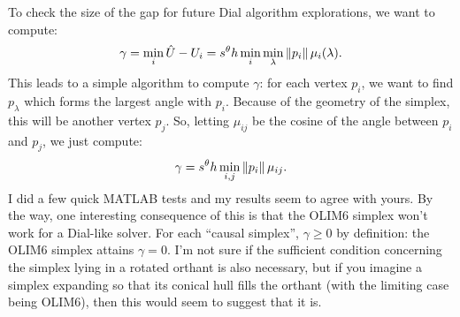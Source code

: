 \documentclass[eikonal.tex]{subfiles}
\begin{document}
To check the size of the gap for future Dial algorithm explorations,
we want to compute:
\begin{equation}
  \gamma = \min_i \hat{U} - U_i = s^\theta h \min_i \min_\lambda \left\|p_i\right\| \mu_i(\lambda).
\end{equation}
This leads to a simple algorithm to compute $\gamma$: for each vertex
$p_i$, we want to find $p_\lambda$ which forms the largest angle with
$p_i$. Because of the geometry of the simplex, this will be another
vertex $p_j$. So, letting $\mu_{ij}$ be the cosine of the angle
between $p_i$ and $p_j$, we just compute:
\begin{equation}
  \gamma = s^\theta h \min_{i,j} \left\|p_i\right\| \mu_{ij}.
\end{equation}
I did a few quick MATLAB tests and my results seem to agree with
yours.  By the way, one interesting consequence of this is that the
OLIM6 simplex won't work for a Dial-like solver. For each ``causal
simplex'', $\gamma \geq 0$ by definition: the OLIM6 simplex attains
$\gamma = 0$. I'm not sure if the sufficient condition concerning the
simplex lying in a rotated orthant is also necessary, but if you
imagine a simplex expanding so that its conical hull fills the orthant
(with the limiting case being OLIM6), then this would seem to suggest
that it is.
\end{document}
